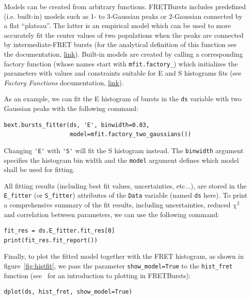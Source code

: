 \documentclass[10pt,letterpaper]{article}
\begin{document}
Models can be created from arbitrary functions. 
FRETBursts includes predefined (i.e. built-in) models 
such as 1- to 3-Gaussian peaks or 2-Gaussian connected by a flat ``plateau''.
The latter is an empirical model which
can be used to more accurately fit the center values of two populations
when the peaks are connected by intermediate-FRET bursts
(for the analytical definition of this function see the documentation, 
\href{http://fretbursts.readthedocs.io/en/latest/mfit.html#fretbursts.mfit.factory_two_gaussians}{link}).
Built-in models are created by calling a corresponding factory function
(whose names start with \verb|mfit.factory_|) which initializes the parameters
with values and constraints suitable for E and S histograms fits
(see \textit{Factory Functions} documentation,
\href{http://fretbursts.readthedocs.org/en/latest/mfit.html#model-factory-functions}{link}).

As an example, we can fit the E histogram of bursts in the
\verb|ds| variable with two Gaussian peaks with the following command:

\begin{lstlisting}
bext.bursts_fitter(ds, 'E', binwidth=0.03,
                   model=mfit.factory_two_gaussians())
\end{lstlisting}

Changing \verb|'E'| with \verb|'S'| will fit the S histogram instead.
The \verb|binwidth| argument specifies the histogram bin width and
the \verb|model| argument defines which model shall be used for
fitting.

All fitting results (including best fit values, uncertainties, etc...),
are stored in the \verb|E_fitter| (or \verb|S_fitter|)
attributes of the \verb|Data| variable (named \verb|ds| here).
To print a comprehensive summary of the fit results, including
uncertainties, reduced $\chi^2$ and correlation between parameters,
we can use the following command:

\begin{lstlisting}
fit_res = ds.E_fitter.fit_res[0]
print(fit_res.fit_report())
\end{lstlisting}

Finally, to plot the fitted model together with the FRET histogram,
as shown in figure~\ref{fig:histfit}, we pass the parameter \verb|show_model=True|
to the \verb|hist_fret| function 
(see~ for an introduction to plotting in FRETBursts):

\begin{lstlisting}
dplot(ds, hist_fret, show_model=True)
\end{lstlisting}
\end{document}
